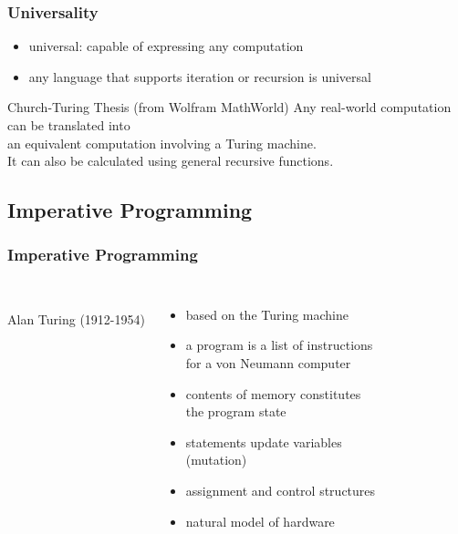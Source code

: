 \documentclass[dvipsnames]{beamer}
\theoremstyle{plain}
\begin{document}
\begin{frame}
  \frametitle{Universality}

  \begin{itemize}
    \item \alert{universal}: capable of expressing any computation
    \item any language that supports iteration or recursion is universal
  \end{itemize}

  \pause
  \medskip
  \begin{block}{Church-Turing Thesis (from Wolfram MathWorld)}
    Any real-world computation can be translated into\\
    an equivalent computation involving a Turing machine.\\
    \medskip
    It can also be calculated using general recursive functions.
  \end{block}
\end{frame}

\subsection{Imperative Programming}

\begin{frame}
  \frametitle{Imperative Programming}

  \begin{columns}
    \begin{center}
      \\
      Alan Turing (1912-1954)
    \end{center}

    \begin{itemize}
      \item based on the Turing machine
      \item a program is a list of instructions\\
        for a von Neumann computer
      \item contents of memory constitutes\\
        the program \alert{state}

      \pause
      \medskip
      \item statements update variables\\
        (\alert{mutation})
      \item assignment and control structures
      \item natural model of hardware
    \end{itemize}
  \end{columns}
\end{frame}
\end{document}
